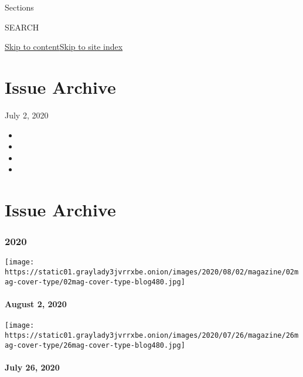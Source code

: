 Sections

SEARCH

\protect\hyperlink{site-content}{Skip to
content}\protect\hyperlink{site-index}{Skip to site index}

\hypertarget{issue-archive}{%
\section{Issue Archive}\label{issue-archive}}

July 2, 2020

\begin{itemize}
\item
\item
\item
\item
\end{itemize}

\hypertarget{issue-archive-1}{%
\section{Issue Archive}\label{issue-archive-1}}

\hypertarget{2020}{%
\subsubsection{2020}\label{2020}}

\href{https://www.nytimes3xbfgragh.onion/issue/magazine/2020/07/31/the-8220-issue}{}

\texttt{[image: https://static01.graylady3jvrrxbe.onion/images/2020/08/02/magazine/02mag-cover-type/02mag-cover-type-blog480.jpg]}

\hypertarget{august-2-2020}{%
\paragraph{August 2, 2020}\label{august-2-2020}}

\href{https://www.nytimes3xbfgragh.onion/issue/magazine/2020/07/24/the-72620-issue}{}

\texttt{[image: https://static01.graylady3jvrrxbe.onion/images/2020/07/26/magazine/26mag-cover-type/26mag-cover-type-blog480.jpg]}

\hypertarget{july-26-2020}{%
\paragraph{July 26, 2020}\label{july-26-2020}}

\href{https://www.nytimes3xbfgragh.onion/issue/magazine/2020/07/17/the-71920-issue}{}

